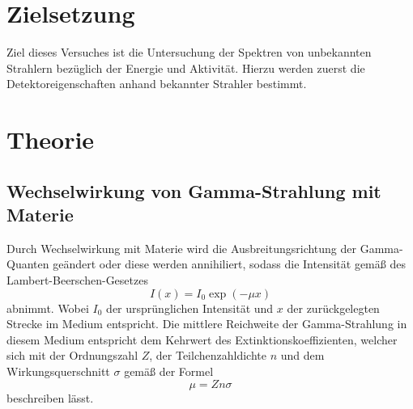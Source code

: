 



\maketitle
\section{Zielsetzung}
Ziel dieses Versuches ist die Untersuchung der Spektren von unbekannten Strahlern bezüglich der Energie und Aktivität.
Hierzu werden zuerst die Detektoreigenschaften anhand bekannter Strahler bestimmt. 

\section{Theorie}
\subsection{Wechselwirkung von Gamma-Strahlung mit Materie}
Durch Wechselwirkung mit Materie wird die Ausbreitungsrichtung der Gamma-Quanten geändert oder diese werden annihiliert, sodass die Intensität gemäß des Lambert-Beerschen-Gesetzes
\begin{equation}
I(x) = I_0 \exp(-\mu x)
\end{equation}
abnimmt.
Wobei $I_0$ der ursprünglichen Intensität und $x$ der zurückgelegten Strecke im Medium entspricht.
Die mittlere Reichweite der Gamma-Strahlung in diesem Medium entspricht dem Kehrwert des Extinktionskoeffizienten, welcher sich mit der Ordnungszahl $Z$, der Teilchenzahldichte $n$ und dem Wirkungsquerschnitt $\sigma$ gemäß der Formel
\begin{equation}\label{eq:mu}
\mu = Zn\sigma
\end{equation}
beschreiben lässt.

